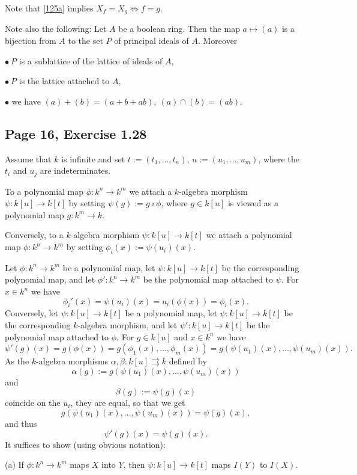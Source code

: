\documentclass[parskip=half,fontsize=12pt]{scrartcl}%
\begin{document}
Note that \eqref{125a} implies $X_f=X_g\iff f=g$.

Note also the following: Let $A$ be a boolean ring. Then the map $a\mapsto(a)$ is a bijection from $A$ to the set $P$ of principal ideals of $A$. Moreover 

$\bullet\ P$ is a sublattice of the lattice of ideals of $A$, 

$\bullet\  P$ is the lattice attached to $A$,

$\bullet$ we have $(a)+(b)=(a+b+ab),\ (a)\cap(b)=(ab)$. 

\subsection{Page 16, Exercise 1.28}%

Assume that $k$ is infinite and set $t:=(t_1,\dots,t_n)$, $u:=(u_1,\dots,u_m)$, where the $t_i$ and $u_j$ are indeterminates. 

To a polynomial map $\phi:k^n\to k^m$ we attach a $k$-algebra morphism $\psi:k[u]\to k[t]$ by setting $\psi(g):=g\circ\phi$, where $g\in k[u]$ is viewed as a polynomial map $g:k^m\to k$. 

Conversely, to a $k$-algebra morphism $\psi:k[u]\to k[t]$ we attach a polynomial map $\phi:k^n\to k^m$ by setting $\phi_i(x):=\psi(u_i)(x)$. 

Let $\phi:k^n\to k^m$ be a polynomial map, let $\psi:k[u]\to k[t]$ be the corresponding polynomial map, and let $\phi':k^n\to k^m$ be the polynomial map attached to $\psi$. For $x\in k^n$ we have 
$$\phi_i'(x)=\psi(u_i)(x)=u_i(\phi(x))=\phi_i(x).
$$ 
Conversely, let $\psi:k[u]\to k[t]$ be a polynomial map, let $\psi:k[u]\to k[t]$ be the corresponding $k$-algebra morphism, and let $\psi':k[u]\to k[t]$ be the polynomial map attached to $\phi$. For $g\in k[u]$ and $x\in k^n$ we have 
$$
\psi'(g)(x)=g(\phi(x))=g(\phi_1(x),\dots,\phi_m(x))=g(\psi(u_1)(x),\dots,\psi(u_m)(x)). 
$$ 
As the $k$-algebra morphisms $\alpha,\beta:k[u]\rightrightarrows k$ defined by 
$$
\alpha(g):=g(\psi(u_1)(x),\dots,\psi(u_m)(x))
$$ 
and 
$$
\beta(g):=\psi(g)(x)
$$ 
coincide on the $u_i$, they are equal, so that we get 
\begin{equation}\label{128}
g(\psi(u_1)(x),\dots,\psi(u_m)(x))=\psi(g)(x),
\end{equation}
and thus 
$$
\psi'(g)(x)=\psi(g)(x).
$$ 
It suffices to show (using obvious notation):

(a) If $\phi:k^n\to k^m$ maps $X$ into $Y$, then $\psi:k[u]\to k[t]$ maps $I(Y)$ to $I(X)$. 
\end{document}
